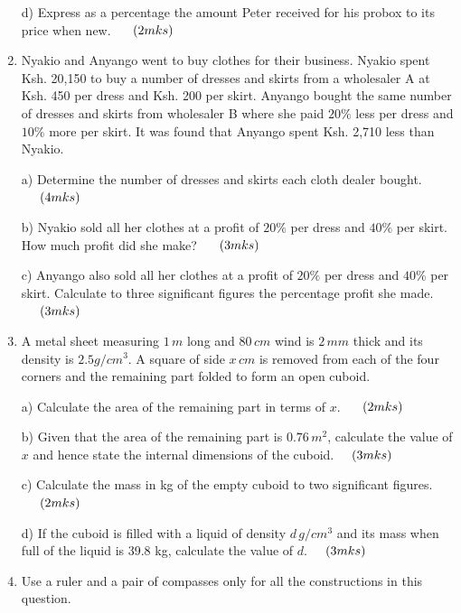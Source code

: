 \documentclass[
  a4paperpaper,
]{scrbook}
\begin{document}
\begin{tcolorbox}
\begin{enumerate}
  d) Express as a percentage the amount Peter received for his probox to
  its price when new. \(\hspace{0.5cm} (2mks)\)
\item
  Nyakio and Anyango went to buy clothes for their business. Nyakio
  spent Ksh. 20,150 to buy a number of dresses and skirts from a
  wholesaler A at Ksh. 450 per dress and Ksh. 200 per skirt. Anyango
  bought the same number of dresses and skirts from wholesaler B where
  she paid \(20\%\) less per dress and \(10\%\) more per skirt. It was
  found that Anyango spent Ksh. 2,710 less than Nyakio.

  a) Determine the number of dresses and skirts each cloth dealer
  bought.\(\hspace{0.5cm} (4mks)\)

  b) Nyakio sold all her clothes at a profit of \(20\%\) per dress and
  \(40\%\) per skirt. How much profit did she make?
  \(\hspace{0.5cm} (3mks)\)

  c) Anyango also sold all her clothes at a profit of \(20\%\) per dress
  and \(40\%\) per skirt. Calculate to three significant figures the
  percentage profit she made. \(\hspace{0.5cm} (3mks)\)
\item
  A metal sheet measuring \(1 \,m\) long and \(80 \,cm\) wind is
  \(2\,mm\) thick and its density is \(2.5 g/cm^3\). A square of side
  \(x\, cm\) is removed from each of the four corners and the remaining
  part folded to form an open cuboid.

  a) Calculate the area of the remaining part in terms of \(x\).
  \(\hspace{0.5cm} (2mks)\)

  b) Given that the area of the remaining part is \(0.76 \,m^2\),
  calculate the value of \(x\) and hence state the internal dimensions
  of the cuboid.\(\hspace{0.5cm}(3mks)\)

  c) Calculate the mass in kg of the empty cuboid to two significant
  figures.\(\hspace{0.5cm}(2mks)\)

  d) If the cuboid is filled with a liquid of density \(d \,g/cm^3\) and
  its mass when full of the liquid is 39.8 kg, calculate the value of
  \(d\).\(\hspace{0.5cm}(3mks)\)
\item
  Use a ruler and a pair of compasses only for all the constructions in
  this question.


\end{enumerate}
\end{tcolorbox}
\end{document}
